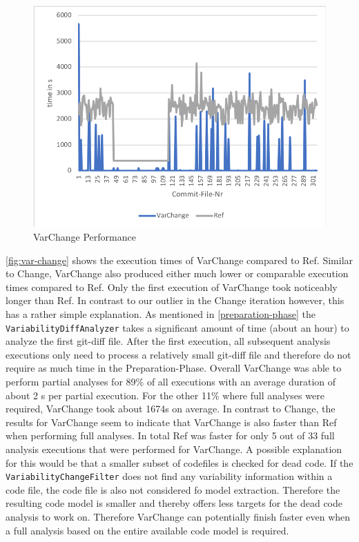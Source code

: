 \documentclass[a4paper]{article}
\begin{document}
\begin{figure}[h] 
  \centering
  \begin{minipage}[b]{1\textwidth} 
    \caption[VarChange Performance]{VarChange Performance}\label{fig:var-change}
    \includegraphics[width=1\textwidth]{img/var-change-vs-ref.png}
  \end{minipage}
\end{figure}

\autoref{fig:var-change} shows the execution times of VarChange compared to Ref. Similar to Change, VarChange also produced either much lower or comparable execution times compared to Ref. Only the first execution of VarChange took noticeably longer than Ref. In contrast to our outlier in the Change iteration however, this has a rather simple explanation. As mentioned in \autoref{preparation-phase} the \texttt{Variability\-Diff\-Analyzer} takes a significant amount of time (about an hour) to analyze the first git-diff file. After the first execution, all subsequent analysis executions only need to process a relatively small git-diff file and therefore do not require as much time in the Preparation-Phase.  Overall VarChange was able to perform partial analyses for 89\% of all executions with an average duration of about 2 s per partial execution. For the other 11\% where full analyses were required, VarChange took about 1674s on average. In contrast to Change, the results for VarChange seem to indicate that VarChange is also faster than Ref when performing full analyses. In total Ref was faster for only 5 out of 33 full analysis executions that were performed for VarChange. A possible explanation for this would be that a smaller subset of codefiles is checked for dead code. If the \texttt{VariabilityChangeFilter} does not find any variability information within a code file, the code file is also not considered fo model extraction. Therefore the resulting code model is smaller and thereby offers less targets for the dead code analysis to work on. Therefore VarChange can potentially finish faster even when a full analysis based on the entire available code model is required.
\end{document}
